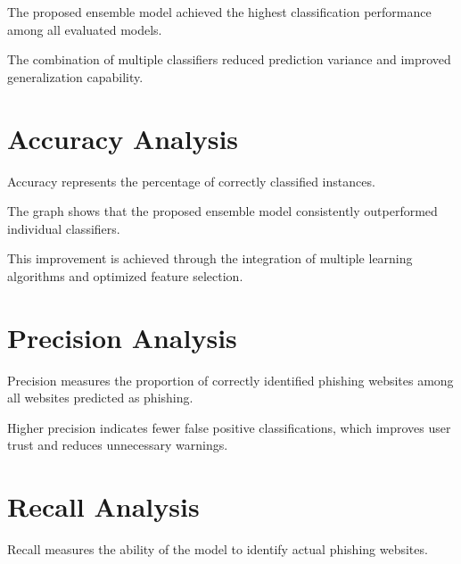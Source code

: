 \documentclass[12pt]{report}
\begin{document}
The proposed ensemble model achieved the highest classification performance among all evaluated models.

The combination of multiple classifiers reduced prediction variance and improved generalization capability.

\section{Accuracy Analysis}

Accuracy represents the percentage of correctly classified instances.


The graph shows that the proposed ensemble model consistently outperformed individual classifiers.

This improvement is achieved through the integration of multiple learning algorithms and optimized feature selection.

\section{Precision Analysis}

Precision measures the proportion of correctly identified phishing websites among all websites predicted as phishing.


Higher precision indicates fewer false positive classifications, which improves user trust and reduces unnecessary warnings.

\section{Recall Analysis}

Recall measures the ability of the model to identify actual phishing websites.

\end{document}
